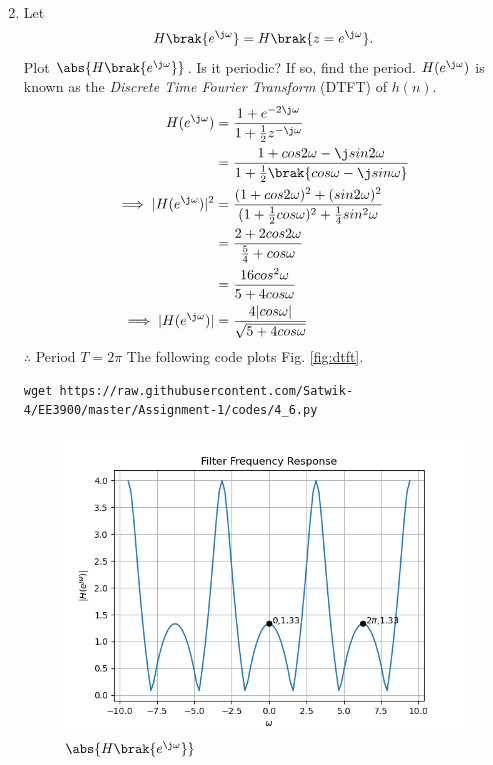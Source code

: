 \documentclass[journal,12pt,twocolumn]{IEEEtran}
\renewcommand\thesection{\arabic{section}}
\begin{document}
\begin{enumerate}[label=\thesection.\arabic*]
\begin{align}
\end{align}
\item 
Let
\begin{equation}
H\brak{e^{\j \omega}} = H\brak{z = e^{\j \omega}}.
\end{equation}
Plot $\abs{H\brak{e^{\j \omega}}}$.  Is it periodic? If so, find the period. $H(e^{\j \omega})$ is
known as the {\em Discrete Time Fourier Transform} (DTFT) of $h(n)$.\\
\solution 
\begin{align}
H(e^{\j\omega}) &= \frac{1 + e^{-2\j\omega}}{1 + \frac{1}{2}z^{-\j\omega}}\\
&= \frac{1+cos2\omega-\j sin2\omega}{1+\frac{1}{2}\brak{cos\omega-\j sin\omega}}\\
\implies |H(e^{\j\omega})|^2&= \frac{(1+cos2\omega)^2+(sin2\omega)^2}{(1+\frac{1}{2}cos\omega)^2+\frac{1}{4}sin^2\omega}\\
&= \frac{2+2cos2\omega}{\frac{5}{4}+cos\omega}\\
&= \frac{16cos^2\omega}{5+4cos\omega}\\
\implies |H(e^{\j\omega})| &= \frac{4|cos\omega|}{\sqrt{5+4cos\omega}}
\end{align}
$\therefore$ Period  $ T= 2\pi $
The following code plots Fig. \ref{fig:dtft}.
\begin{lstlisting}
wget https://raw.githubusercontent.com/Satwik-4/EE3900/master/Assignment-1/codes/4_6.py
\end{lstlisting}
\begin{figure}[!ht]
\centering
\includegraphics[width=\columnwidth]{figures/Figure_2.png}
\caption{$\abs{H\brak{e^{\j\omega}}}$}

\end{figure}
\end{enumerate}
\end{document}
